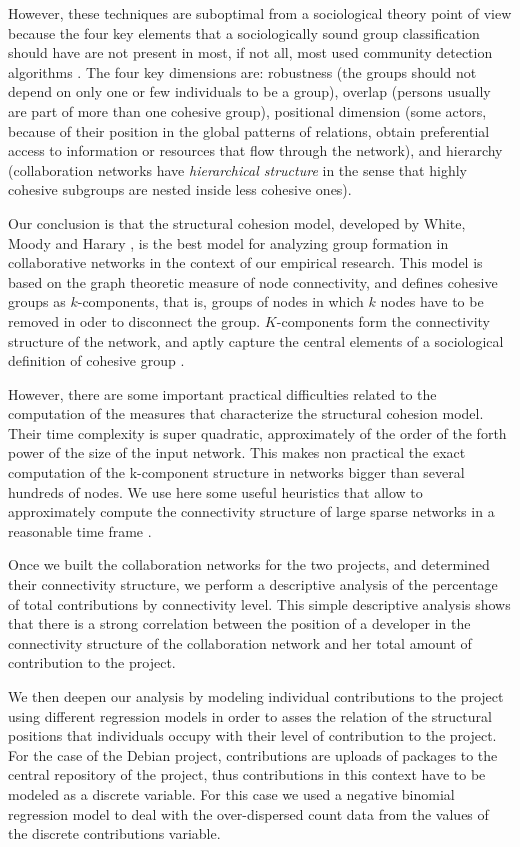 However, these techniques are suboptimal from a sociological theory point of view because the four key elements that a sociologically sound group classification should have are not present in most, if not all, most used community detection algorithms \citep{torrents:2015}. The four key dimensions are: robustness (the groups should not depend on only one or few individuals to be a group), overlap (persons usually are part of more than one cohesive group), positional dimension (some actors, because of their position in the global patterns of relations, obtain preferential access to information or resources that flow through the network), and hierarchy (collaboration networks have \emph{hierarchical structure} in the sense that highly cohesive subgroups are nested inside less cohesive ones).

Our conclusion is that the structural cohesion model, developed by White, Moody and Harary \citep{white:2001, moody:2003}, is the best model for analyzing group formation in collaborative networks in the context of our empirical research. This model is based on the graph theoretic measure of node connectivity, and defines cohesive groups as $k$-components, that is, groups of nodes in which $k$ nodes have to be removed in oder to disconnect the group. $K$-components form the connectivity structure of the network, and aptly capture the central elements of a sociological definition of cohesive group \citep{torrents:2015}.

However, there are some important practical difficulties related to the computation of the measures that characterize the structural cohesion model. Their time complexity is super quadratic, approximately of the order of the forth power of the size of the input network. This makes non practical the exact computation of the k-component structure in networks bigger than several hundreds of nodes. We use here some useful heuristics that allow to approximately compute the connectivity structure of large sparse networks in a reasonable time frame \citep{torrents:2015}.

Once we built the collaboration networks for the two projects, and determined their connectivity structure, we perform a descriptive analysis of the percentage of total contributions by connectivity level. This simple descriptive analysis shows that there is a strong correlation between the position of a developer in the connectivity structure of the collaboration network and her total amount of contribution to the project.

We then deepen our analysis by modeling individual contributions to the project using different regression models in order to asses the relation of the structural positions that individuals occupy with their level of contribution to the project. For the case of the Debian project, contributions are uploads of packages to the central repository of the project, thus contributions in this context have to be modeled as a discrete variable. For this case we used a negative binomial regression model to deal with the over-dispersed count data from the values of the discrete contributions variable.

